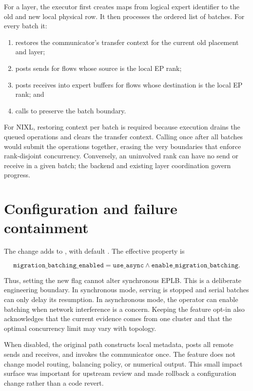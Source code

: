 For a layer, the executor first creates maps from logical expert identifier to
the old and new local physical row. It then processes the ordered list of
batches. For every batch it:

\begin{enumerate}
  \item restores the communicator's transfer context for the current old
  placement and layer;
  \item posts sends for flows whose source is the local EP rank;
  \item posts receives into expert buffers for flows whose destination is the
  local EP rank; and
  \item calls  to preserve the batch boundary.
\end{enumerate}

For NIXL, restoring context per batch is required because execution drains the
queued operations and clears the transfer context. Calling 
once after all batches would submit the operations together, erasing the very
boundaries that enforce rank-disjoint concurrency. Conversely, an uninvolved
rank can have no send or receive in a given batch; the backend and existing
layer coordination govern progress.

\section{Configuration and failure containment}

The change adds  to , with
default . The effective property is

\begin{equation}
  \texttt{migration\_batching\_enabled}
  =\texttt{use\_async}\land\texttt{enable\_migration\_batching}.
\end{equation}

Thus, setting the new flag cannot alter synchronous EPLB. This is a deliberate
engineering boundary. In synchronous mode, serving is stopped and serial
batches can only delay its resumption. In asynchronous mode, the operator can
enable batching when network interference is a concern. Keeping the feature
opt-in also acknowledges that the current evidence comes from one cluster and
that the optimal concurrency limit may vary with topology.

When disabled, the original path constructs local metadata, posts all remote
sends and receives, and invokes the communicator once. The feature does not
change model routing, balancing policy, or numerical output. This small impact
surface was important for upstream review and made rollback a configuration
change rather than a code revert.

